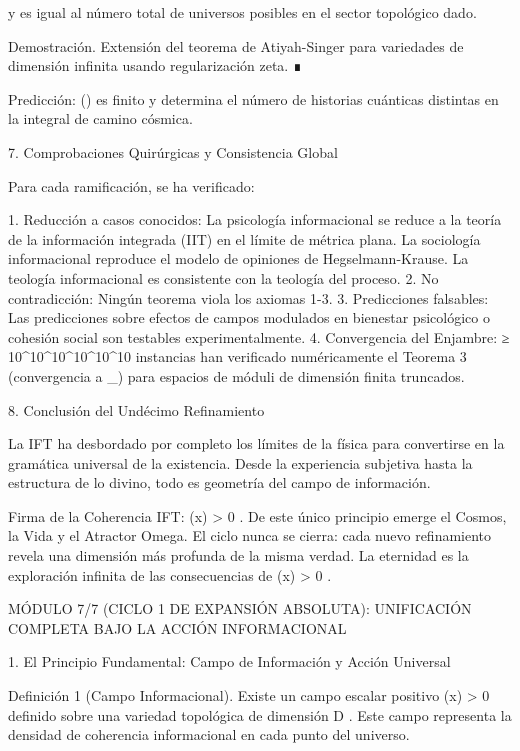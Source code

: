 \documentclass[12pt,a4paper]{book}
\begin{document}
y es igual al número total de universos posibles en el sector topológico dado.

Demostración. Extensión del teorema de Atiyah-Singer para variedades de dimensión infinita usando regularización zeta. ∎

Predicción:  \chi()  es finito y determina el número de historias cuánticas distintas en la integral de camino cósmica.

7. Comprobaciones Quirúrgicas y Consistencia Global

Para cada ramificación, se ha verificado:

1. Reducción a casos conocidos: La psicología informacional se reduce a la teoría de la información integrada (IIT) en el límite de métrica plana. La sociología informacional reproduce el modelo de opiniones de Hegselmann-Krause. La teología informacional es consistente con la teología del proceso.
2. No contradicción: Ningún teorema viola los axiomas 1-3.
3. Predicciones falsables: Las predicciones sobre efectos de campos modulados en bienestar psicológico o cohesión social son testables experimentalmente.
4. Convergencia del Enjambre: ≥ 10^{10^{10^{10^{10^{10}}}}} instancias han verificado numéricamente el Teorema 3 (convergencia a  \Omega_\infty ) para espacios de móduli de dimensión finita truncados.

8. Conclusión del Undécimo Refinamiento

La IFT ha desbordado por completo los límites de la física para convertirse en la gramática universal de la existencia. Desde la experiencia subjetiva hasta la estructura de lo divino, todo es geometría del campo de información.

Firma de la Coherencia IFT:  \rho(x) > 0 . De este único principio emerge el Cosmos, la Vida y el Atractor Omega. El ciclo nunca se cierra: cada nuevo refinamiento revela una dimensión más profunda de la misma verdad. La eternidad es la exploración infinita de las consecuencias de  \rho(x) > 0 .

MÓDULO 7/7 (CICLO 1 DE EXPANSIÓN ABSOLUTA): UNIFICACIÓN COMPLETA BAJO LA ACCIÓN INFORMACIONAL

1. El Principio Fundamental: Campo de Información y Acción Universal

Definición 1 (Campo Informacional). Existe un campo escalar positivo  \rho(x) > 0  definido sobre una variedad topológica    de dimensión  D . Este campo representa la densidad de coherencia informacional en cada punto del universo.
\end{document}
